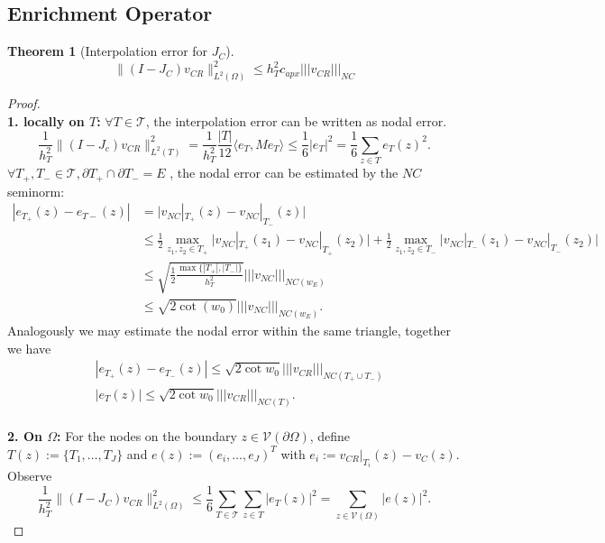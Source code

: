 \documentclass[a4paper,12pt,oneside,fleqn]{book}
\newtheorem{theorem}{Theorem}[section]
\theoremstyle{definition}
\theoremstyle{remark}
\begin{document}
\subsection{Enrichment Operator}
\begin{theorem}[Interpolation error for $J_C$]

\begin{equation}
	\|(I - J_C) v_{CR}\|_{L^2(\Omega)}^2 \le h_T^2 c_{apx} |||v_{CR}|||_{NC}
\end{equation}


\end{theorem}
\begin{proof}
\quad\\
\textbf{1. locally on $T$:  }
$\forall T \in \mathcal{T}$, the interpolation error can be written as  nodal error. 
\begin{equation}
	\frac{1}{h_{T}^2}\| (I - J_c)v_{CR}\|_{L^2(T)}^2 = \frac{1}{h_T^2} \frac{|T|}{12} \langle e_T, M e_T \rangle \le \frac{1}{6}|e_T|^2 =  \frac{1}{6}\sum_{ z \in T}e_T(z)^2 . 
\end{equation}	
$\forall T_+, T_- \in \mathcal{T}, \partial T_+ \cap \partial T_- = E$ , the nodal error can be estimated by the $NC$ seminorm:
\begin{align*}
	|e_{T_+}(z) - e_{T-}(z)| & = \bigg|v_{NC}|_{T_+}(z) - v_{NC}|_{T_-}(z)\bigg|\\
	& \le \frac{1}{2} \max_{z_1, z_2 \in T_+} \bigg|v_{NC}|_{T_+}(z_1) - v_{NC}|_{T_+}(z_2) \bigg| + \frac{1}{2} \max_{z_1, z_2 \in T_-} \bigg|v_{NC}|_{T_-}(z_1) - v_{NC}|_{T_-}(z_2) \bigg|\\
	& \le \sqrt{\frac{1}{2} \frac{\max\{|T_+|, |T_-|\}}{h_T^2}} |||v_{NC}|||_{NC(w_E)}\\
	& \le \sqrt{2 \cot (w_0)}|||v_{NC}|||_{NC(w_E)}. 
\end{align*}
Analogously we may estimate the nodal error within the same triangle, together we have
\begin{align*}
	& |e_{T_+}(z) - e_{T_-}(z)| \le \sqrt{2 \cot w_0}|||v_{CR}|||_{NC(T_+ \cup T_-)}\\
	& |e_T(z)| \le \sqrt{2\cot w_0}||| v_{CR}|||_{NC(T)}. 
\end{align*}
\quad\\
\textbf{2. On $\Omega$: } For the nodes on the boundary $z \in \mathcal{V}(\partial\Omega)$, define $T(z) := \{T_1, \dots, T_J\}$ and  $e(z) := (e_i, \dots, e_J)^T$ with $e_i := v_{CR}|_{T_i}(z) - v_C(z)$. Observe
\begin{equation*}
	\frac{1}{h^2_T}\|(I - J_C)v_{CR}\|_{L^2(\Omega)}^2 \le \frac{1}{6}\sum_{T \in \mathcal{T}} \sum_{z \in T} |e_T(z)|^2 = \sum_{z \in \mathcal{V}(\Omega)} |e(z)|^2.

\end{equation*}
\end{proof}
\end{document}
